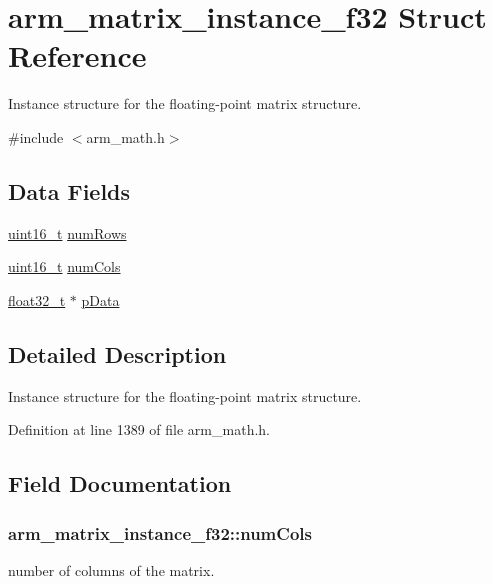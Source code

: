 \hypertarget{structarm__matrix__instance__f32}{\section{arm\-\_\-matrix\-\_\-instance\-\_\-f32 Struct Reference}
\label{structarm__matrix__instance__f32}
}


Instance structure for the floating-\/point matrix structure.  




{\ttfamily \#include $<$arm\-\_\-math.\-h$>$}

\subsection*{Data Fields}
\begin{DoxyCompactItemize}
\item 
\hyperlink{stdint_8h_a273cf69d639a59973b6019625df33e30}{uint16\-\_\-t} \hyperlink{structarm__matrix__instance__f32_a23f4e34d70a82c9cad7612add5640b7b}{num\-Rows}
\item 
\hyperlink{stdint_8h_a273cf69d639a59973b6019625df33e30}{uint16\-\_\-t} \hyperlink{structarm__matrix__instance__f32_acdd1fb73734df68b89565c54f1dd8ae2}{num\-Cols}
\item 
\hyperlink{arm__math_8h_a4611b605e45ab401f02cab15c5e38715}{float32\-\_\-t} $\ast$ \hyperlink{structarm__matrix__instance__f32_af3917c032600a9dfd5ed4a96f074910a}{p\-Data}
\end{DoxyCompactItemize}


\subsection{Detailed Description}
Instance structure for the floating-\/point matrix structure. 

Definition at line 1389 of file arm\-\_\-math.\-h.



\subsection{Field Documentation}
\hypertarget{structarm__matrix__instance__f32_acdd1fb73734df68b89565c54f1dd8ae2}{
\subsubsection[{num\-Cols}]{ arm\-\_\-matrix\-\_\-instance\-\_\-f32\-::num\-Cols}}\label{structarm__matrix__instance__f32_acdd1fb73734df68b89565c54f1dd8ae2}
number of columns of the matrix. 

